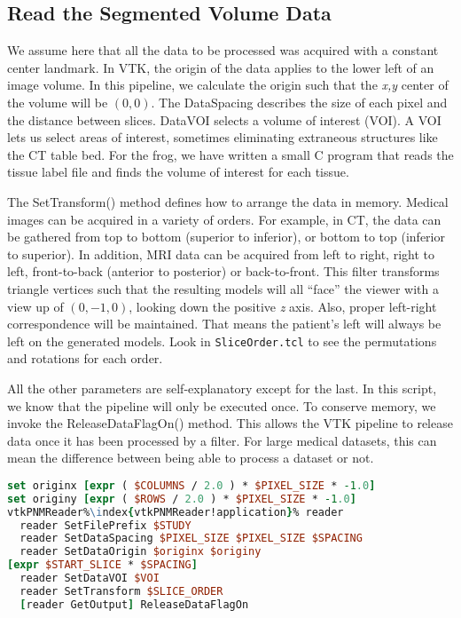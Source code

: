 \subsection{Read the Segmented Volume Data}

We assume here that all the data to be processed was acquired with a constant center landmark. In VTK, the origin of the data applies to the lower left of an image volume. In this pipeline, we calculate the origin such that the \emph{x,y} center of the volume will be $(0,0)$. The DataSpacing describes the size of each pixel and the distance between slices. DataVOI selects a volume of interest (VOI). A VOI lets us select areas of interest, sometimes eliminating extraneous structures like the CT table bed. For the frog, we have written a small C program that reads the tissue label file and finds the volume of interest for each tissue.

The SetTransform() method defines how to arrange the data in memory. Medical images can be acquired in a variety of orders. For example, in CT, the data can be gathered from top to bottom (superior to inferior), or bottom to top (inferior to superior). In addition, MRI data can be acquired from left to right, right to left, front-to-back (anterior to posterior) or back-to-front. This filter transforms triangle vertices such that the resulting models will all ``face'' the viewer with a view up of $(0,-1,0)$, looking down the positive \emph{z} axis. Also, proper left-right correspondence will be maintained. That means the patient's left will always be left on the generated models. Look in \texttt{SliceOrder.tcl} to see the permutations and rotations for each order.

All the other parameters are self-explanatory except for the last. In this script, we know that the pipeline will only be executed once. To conserve memory, we invoke the ReleaseDataFlagOn() method. This allows the VTK pipeline to release data once it has been processed by a filter. For large medical datasets, this can mean the difference between being able to process a dataset or not.

\begin{lstlisting}[language=TCL, caption={Read the Segmented Volume Data.}, escapechar=\%]
set originx [expr ( $COLUMNS / 2.0 ) * $PIXEL_SIZE * -1.0]
set originy [expr ( $ROWS / 2.0 ) * $PIXEL_SIZE * -1.0]
vtkPNMReader%\index{vtkPNMReader!application}% reader
  reader SetFilePrefix $STUDY
  reader SetDataSpacing $PIXEL_SIZE $PIXEL_SIZE $SPACING
  reader SetDataOrigin $originx $originy
[expr $START_SLICE * $SPACING]
  reader SetDataVOI $VOI
  reader SetTransform $SLICE_ORDER
  [reader GetOutput] ReleaseDataFlagOn
\end{lstlisting}

